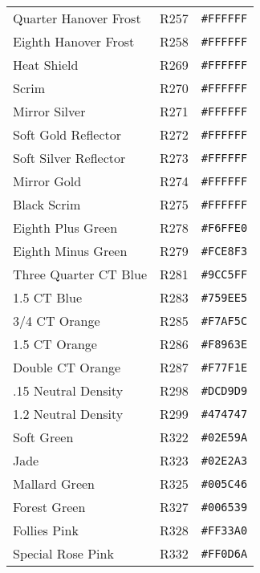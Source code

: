 \documentclass[a4paper]{article}
\begin{document}
\begin{longtable}{|l|l|r|}
Quarter Hanover Frost & R257 & \texttt{\#FFFFFF} \cellcolor[HTML]{FFFFFF} \\
Eighth Hanover Frost & R258 & \texttt{\#FFFFFF} \cellcolor[HTML]{FFFFFF} \\
Heat Shield & R269 & \texttt{\#FFFFFF} \cellcolor[HTML]{FFFFFF} \\
Scrim & R270 & \texttt{\#FFFFFF} \cellcolor[HTML]{FFFFFF} \\
Mirror Silver & R271 & \texttt{\#FFFFFF} \cellcolor[HTML]{FFFFFF} \\
Soft Gold Reflector & R272 & \texttt{\#FFFFFF} \cellcolor[HTML]{FFFFFF} \\
Soft Silver Reflector & R273 & \texttt{\#FFFFFF} \cellcolor[HTML]{FFFFFF} \\
Mirror Gold & R274 & \texttt{\#FFFFFF} \cellcolor[HTML]{FFFFFF} \\
Black Scrim & R275 & \texttt{\#FFFFFF} \cellcolor[HTML]{FFFFFF} \\
Eighth Plus Green & R278 & \texttt{\#F6FFE0} \cellcolor[HTML]{F6FFE0} \\
Eighth Minus Green & R279 & \texttt{\#FCE8F3} \cellcolor[HTML]{FCE8F3} \\
Three Quarter CT Blue & R281 & \texttt{\#9CC5FF} \cellcolor[HTML]{9CC5FF} \\
1.5 CT Blue & R283 & \texttt{\#759EE5} \cellcolor[HTML]{759EE5} \\
3/4 CT Orange & R285 & \texttt{\#F7AF5C} \cellcolor[HTML]{F7AF5C} \\
1.5 CT Orange & R286 & \texttt{\#F8963E} \cellcolor[HTML]{F8963E} \\
Double CT Orange & R287 & \texttt{\#F77F1E} \cellcolor[HTML]{F77F1E} \\
.15 Neutral Density & R298 & \texttt{\#DCD9D9} \cellcolor[HTML]{DCD9D9} \\
1.2 Neutral Density & R299 & \texttt{\#474747} \cellcolor[HTML]{474747} \\
Soft Green & R322 & \texttt{\#02E59A} \cellcolor[HTML]{02E59A} \\
Jade & R323 & \texttt{\#02E2A3} \cellcolor[HTML]{02E2A3} \\
Mallard Green & R325 & \texttt{\#005C46} \cellcolor[HTML]{005C46} \\
Forest Green & R327 & \texttt{\#006539} \cellcolor[HTML]{006539} \\
Follies Pink & R328 & \texttt{\#FF33A0} \cellcolor[HTML]{FF33A0} \\
Special Rose Pink & R332 & \texttt{\#FF0D6A} \cellcolor[HTML]{FF0D6A} \\

\end{longtable}
\end{document}
